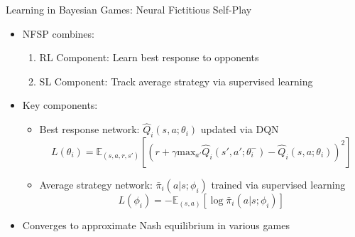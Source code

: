 \documentclass[10pt]{beamer}
\newcommand{\E}{\mathbb{E}}
\renewcommand{\max}{\text{max}}
\begin{document}
\begin{frame}{Learning in Bayesian Games: Neural Fictitious Self-Play}
    \begin{itemize}
        \item NFSP combines:
        \begin{enumerate}
            \item RL Component: Learn best response to opponents
            \item SL Component: Track average strategy via supervised learning
        \end{enumerate}
        \vspace{0.2cm}
        \item Key components:
        \begin{itemize}
            \item Best response network: $\hat{Q}_i(s,a;\theta_i)$ updated via DQN
            \begin{equation}
                L(\theta_i) = \E_{(s,a,r,s')} \left[ \left( r + \gamma \max_{a'} \hat{Q}_i(s',a';\theta_i^-) - \hat{Q}_i(s,a;\theta_i) \right)^2 \right]
            \end{equation}
            
            \item Average strategy network: $\bar{\pi}_i(a|s;\phi_i)$ trained via supervised learning
            \begin{equation}
                L(\phi_i) = -\E_{(s,a)} \left[ \log \bar{\pi}_i(a|s;\phi_i) \right]
            \end{equation}
        \end{itemize}
        \vspace{0.2cm}
        \item Converges to approximate Nash equilibrium in various games
    \end{itemize}
\end{frame}

\end{document}
